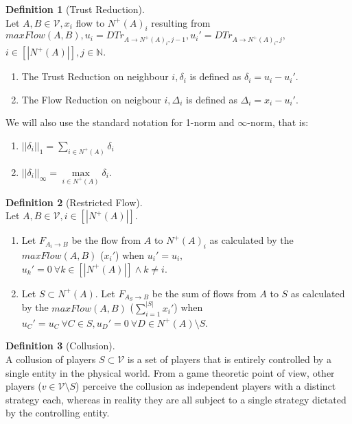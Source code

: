 \documentclass[11pt]{article}
\theoremstyle{definition}
\newtheorem{definition}{Definition}[section]
\theoremstyle{corollary}
\theoremstyle{lemma}
\begin{document}
      \begin{definition}[Trust Reduction] \ \\
         Let $A, B \in \mathcal{V}, x_i$ flow to $N^{+}(A)_i$ resulting from $maxFlow(A,B), u_i =
         DTr_{A \rightarrow N^{+}(A)_i,j-1}, u_i' = DTr_{A \rightarrow N^{+}(A)_i,j},$ \\ $i \in [|N^{+}(A)|],
         j \in \mathbb{N}$.
         \begin{enumerate}
            \item The Trust Reduction on neighbour $i, \delta_i$ is defined as $\delta_i = u_i - u_i'$.
            \item The Flow Reduction on neigbour $i, \Delta_i$ is defined as $\Delta_i = x_i - u_i'$.
         \end{enumerate}
         We will also use the standard notation for 1-norm and $\infty$-norm, that is:
         \begin{enumerate}
            \item $||\delta_i||_1 = \sum\limits_{i \in N^{+}(A)}\delta_i$
            \item $||\delta_i||_\infty = \max\limits_{i \in N^{+}(A)}\delta_i$.
         \end{enumerate}
      \end{definition}
      \begin{definition}[Restricted Flow] \ \\
         Let $A, B \in \mathcal{V}, i \in [|N^{+}(A)|]$.
         \begin{enumerate}
            \item Let $F_{A_i \rightarrow B}$ be the flow from $A$ to $N^{+}(A)_i$ as calculated by the $maxFlow(A,B)$
               ($x_i'$) when $u_i' = u_i,$ \\ $u_k' = 0 \:\forall k \in [|N^{+}(A)|] \wedge k \neq i$.
            \item Let $S \subset N^{+}(A)$. Let $F_{A_S \rightarrow B}$ be the sum of flows from $A$ to $S$ as
               calculated by the $maxFlow(A,B)$ ($\sum\limits_{i=1}^{|S|}x_i'$) when $u_C' = u_C \: \forall C \in S,
               u_D' = 0 \: \forall D \in N^{+}(A) \setminus S$.
         \end{enumerate}
      \end{definition}
      \begin{definition}[Collusion] \ \\
         A collusion of players $S \subset \mathcal{V}$ is a set of players that is entirely controlled by a single entity in
         the physical world. From a game theoretic point of view, other players ($v \in \mathcal{V} \setminus S$) perceive
         the collusion as independent players with a distinct strategy each, whereas in reality they are all subject to a
         single strategy dictated by the controlling entity.
      \end{definition}
\end{document}
